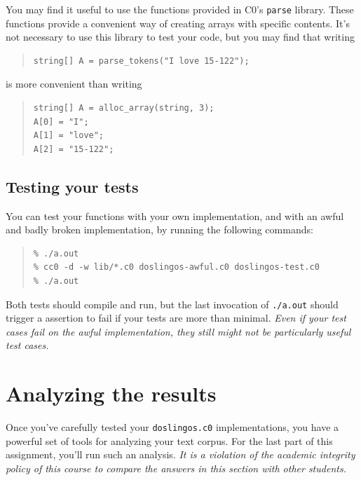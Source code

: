 \documentclass[12pt]{exam}
\begin{document}
You may find it useful to use the functions provided in C0's
\lstinline'parse' library. These functions provide a convenient way
of creating arrays with specific contents.  It's not necessary to use
this library to test your code, but you may find that writing
\begin{quote}
\begin{lstlisting}[numbers=none]
string[] A = parse_tokens("I love 15-122");
\end{lstlisting}
\end{quote}
is more convenient than
writing
\begin{quote}
\begin{lstlisting}[numbers=none]
string[] A = alloc_array(string, 3);
A[0] = "I";
A[1] = "love";
A[2] = "15-122";
\end{lstlisting}
\end{quote}

\subsection*{Testing your tests}

You can test your functions with your own implementation, and with an
awful and badly broken implementation, by running the following
commands:

\begin{quote}
\begin{lstlisting}[language={[coin]C}]
% cc0 -d -w lib/*.c0 doslingos.c0 doslingos-test.c0
% ./a.out
% cc0 -d -w lib/*.c0 doslingos-awful.c0 doslingos-test.c0
% ./a.out
\end{lstlisting}
\end{quote}

Both tests should compile and run, but the last invocation of
\lstinline'./a.out' should trigger a assertion to fail if your tests are
more than minimal. \emph{Even if your test cases fail on the
  awful implementation, they still might not be particularly useful
  test cases.}




\section{Analyzing the results}
\newcommand{\redacted}
 {\underline{\hspace{1.5em}}\mathtt{REDACTED}\underline{\hspace{1.5em}}}

Once you've carefully tested your \lstinline'doslingos.c0' implementations,
you have a powerful set of tools for analyzing your text corpus. For
the last part of this assignment, you'll run such an analysis.
\emph{It is a violation of the academic integrity policy of this
  course to compare the answers in this section with other students.}
\end{document}
